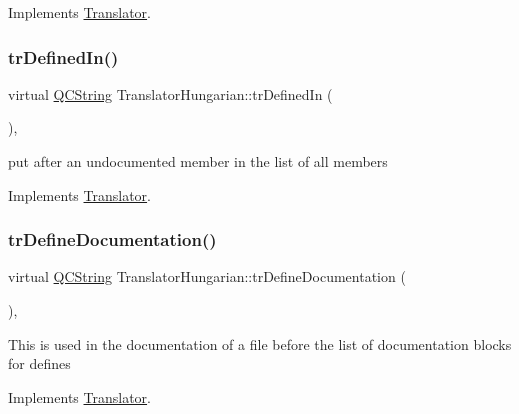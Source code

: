 Implements \mbox{\hyperlink{class_translator}{Translator}}.

\mbox{\label{class_translator_hungarian_a16794914b1f00fd5e535e5561b46ffe7}} 
\subsubsection{\texorpdfstring{trDefinedIn()}{trDefinedIn()}}
{\footnotesize\ttfamily virtual \mbox{\hyperlink{class_q_c_string}{Q\+C\+String}} Translator\+Hungarian\+::tr\+Defined\+In (\begin{DoxyParamCaption}{ }\end{DoxyParamCaption})\hspace{0.3cm}{\ttfamily [inline]}, {\ttfamily [virtual]}}

put after an undocumented member in the list of all members 

Implements \mbox{\hyperlink{class_translator}{Translator}}.

\mbox{\label{class_translator_hungarian_ab8a6330420b74d05198d24efdb6fa476}} 
\subsubsection{\texorpdfstring{trDefineDocumentation()}{trDefineDocumentation()}}
{\footnotesize\ttfamily virtual \mbox{\hyperlink{class_q_c_string}{Q\+C\+String}} Translator\+Hungarian\+::tr\+Define\+Documentation (\begin{DoxyParamCaption}{ }\end{DoxyParamCaption})\hspace{0.3cm}{\ttfamily [inline]}, {\ttfamily [virtual]}}

This is used in the documentation of a file before the list of documentation blocks for defines 

Implements \mbox{\hyperlink{class_translator}{Translator}}.

\mbox{\label{class_translator_hungarian_ad1d4cc58d6b4054848f31ffd2b75d355}} 
